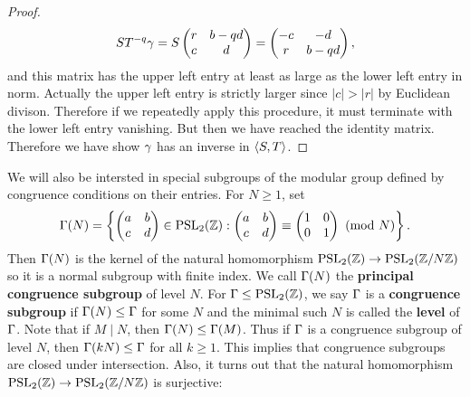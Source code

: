 \begin{proof}
        \[
          ST^{-q}\gamma = S\begin{pmatrix} r & b-qd \\ c & d \end{pmatrix} = \begin{pmatrix} -c & -d \\ r & b-qd \end{pmatrix},
        \]
        and this matrix has the upper left entry at least as large as the lower left entry in norm. Actually the upper left entry is strictly larger since $|c| > |r|$ by Euclidean divison. Therefore if we repeatedly apply this procedure, it must terminate with the lower left entry vanishing. But then we have reached the identity matrix. Therefore we have show $\gamma$ has an inverse in $\langle S,T\rangle$.
      \end{proof}

      We will also be intersted in special subgroups of the modular group defined by congruence conditions on their entries. For $N \ge 1$, set
      \[
        \Gamma(N) = \left\{\begin{pmatrix} a & b \\ c & d \end{pmatrix} \in \mathrm{PSL}_{2}(\mathbb{Z}):\begin{pmatrix} a & b \\ c & d \end{pmatrix} \equiv \begin{pmatrix} 1 & 0 \\ 0 & 1 \end{pmatrix} \ \left(\text{mod }N\right)\right\}.
      \]
      Then $\Gamma(N)$ is the kernel of the natural homomorphism $\mathrm{PSL}_{2}(\mathbb{Z}) \to \mathrm{PSL}_{2}(\mathbb{Z}/N\mathbb{Z})$ so it is a normal subgroup with finite index. We call $\Gamma(N)$ the \textbf{principal congruence subgroup} of level $N$. For $\Gamma \le \mathrm{PSL}_{2}(\mathbb{Z})$, we say $\Gamma$ is a \textbf{congruence subgroup} if $\Gamma(N) \le \Gamma$ for some $N$ and the minimal such $N$ is called the \textbf{level} of $\Gamma$. Note that if $M \mid N$, then $\Gamma(N) \le \Gamma(M)$. Thus if $\Gamma$ is a congruence subgroup of level $N$, then $\Gamma(kN) \le \Gamma$ for all $k \ge 1$. This implies that congruence subgroups are closed under intersection. Also, it turns out that the natural homomorphism $\mathrm{PSL}_{2}(\mathbb{Z}) \to \mathrm{PSL}_{2}(\mathbb{Z}/N\mathbb{Z})$ is surjective:

